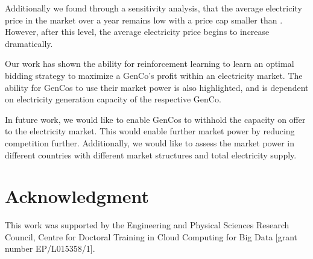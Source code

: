 \documentclass[conference]{IEEEtran}
\begin{document}
Additionally we found through a sensitivity analysis, that the average electricity price in the market over a year remains low with a price cap smaller than . However, after this level, the average electricity price begins to increase dramatically.


Our work has shown the ability for reinforcement learning to learn an optimal bidding strategy to maximize a GenCo's profit within an electricity market. The ability for GenCos to use their market power is also highlighted, and is dependent on electricity generation capacity of the respective GenCo.

In future work, we would like to enable GenCos to withhold the capacity on offer to the electricity market. This would enable further market power by reducing competition further.  Additionally, we would like to assess the market power in different countries with different market structures and total electricity supply.



\section{Acknowledgment}

This work was supported by the Engineering and Physical Sciences Research Council, Centre for Doctoral Training in Cloud Computing for Big Data [grant number EP/L015358/1].





\end{document}
